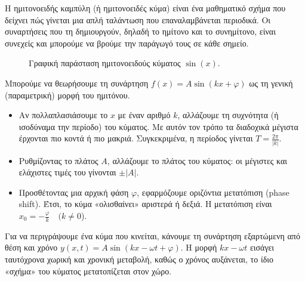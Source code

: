 \documentclass[a4paper, 11pt]{article}
\begin{document}
Η ημιτονοειδής καμπύλη (ή ημιτονοειδές κύμα) είναι ένα μαθηματικό σχήμα
που δείχνει πώς γίνεται μια απλή ταλάντωση που επαναλαμβάνεται
περιοδικά. Οι συναρτήσεις που τη δημιουργούν, δηλαδή το ημίτονο και το
συνημίτονο, είναι συνεχείς και μπορούμε να βρούμε την παράγωγό τους σε
κάθε σημείο.

\begin{figure}[htbp]
\centering
{}
\caption{Γραφική παράσταση ημιτονοειδούς κύματος $\sin(x)$.}
\label{fig:sinx}
\end{figure}

Μπορούμε να θεωρήσουμε τη συνάρτηση \(f(x)=A\sin(kx+\varphi)\) ως τη
γενική (παραμετρική) μορφή του ημιτόνου.

\begin{itemize}
\item
  Αν πολλαπλασιάσουμε το \(x\) με έναν αριθμό \(k\), αλλάζουμε τη
  συχνότητα (ή ισοδύναμα την περίοδο) του κύματος. Με αυτόν τον τρόπο τα
  διαδοχικά μέγιστα έρχονται πιο κοντά ή πιο μακριά. Συγκεκριμένα, η
  περίοδος γίνεται \(T=\frac{2\pi}{|k|}\).
\item
  Ρυθμίζοντας το πλάτος \(A\), αλλάζουμε το πλάτος του κύματος: οι
  μέγιστες και ελάχιστες τιμές του γίνονται \(\pm|A|\).
\item
  Προσθέτοντας μια αρχική φάση \(\varphi\), εφαρμόζουμε οριζόντια
  μετατόπιση (phase shift). Έτσι, το κύμα «ολισθαίνει» αριστερά ή δεξιά.
  Η μετατόπιση είναι \(x_0=-\frac{\varphi}{k}\quad (k\neq 0\)).
\end{itemize}

Για να περιγράψουμε ένα κύμα που κινείται, κάνουμε τη συνάρτηση
εξαρτώμενη από θέση και χρόνο \(y(x,t)=A\sin(kx-\omega t + \varphi)\). Η
μορφή \(kx-\omega t\) εισάγει ταυτόχρονα χωρική και χρονική μεταβολή,
καθώς ο χρόνος αυξάνεται, το ίδιο «σχήμα» του κύματος μετατοπίζεται στον
χώρο.
\end{document}
